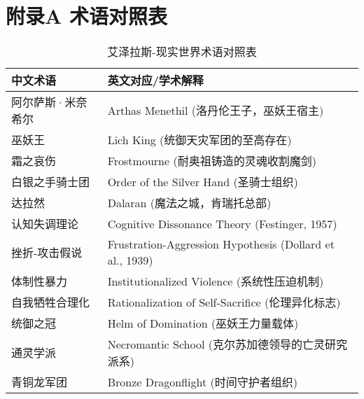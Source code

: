 \section*{附录A 术语对照表}
\label{app:glossary}

\begin{table}[h]
  \centering

  \begin{tabular}{p{5cm}p{8cm}}
    \toprule
    \textbf{中文术语} & \textbf{英文对应/学术解释} \\
    \midrule
    阿尔萨斯·米奈希尔 & Arthas Menethil (洛丹伦王子，巫妖王宿主) \\
    巫妖王 & Lich King (统御天灾军团的至高存在) \\
    霜之哀伤 & Frostmourne (耐奥祖铸造的灵魂收割魔剑) \\
    白银之手骑士团 & Order of the Silver Hand (圣骑士组织) \\
    达拉然 & Dalaran (魔法之城，肯瑞托总部) \\
    认知失调理论 & Cognitive Dissonance Theory (Festinger, 1957) \\
    挫折-攻击假说 & Frustration-Aggression Hypothesis (Dollard et al., 1939) \\
    体制性暴力 & Institutionalized Violence (系统性压迫机制) \\
    自我牺牲合理化 & Rationalization of Self-Sacrifice (伦理异化标志) \\
    统御之冠 & Helm of Domination (巫妖王力量载体) \\
    通灵学派 & Necromantic School (克尔苏加德领导的亡灵研究派系) \\
    青铜龙军团 & Bronze Dragonflight (时间守护者组织) \\
    \bottomrule
  \end{tabular}  
  \caption{艾泽拉斯-现实世界术语对照表}
  \label{tab:glossary}

\end{table}

